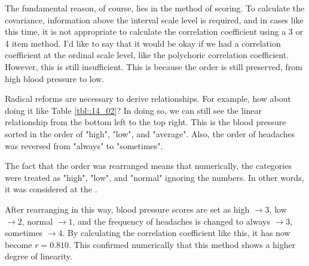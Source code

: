 \documentclass{ltjsbook}
\begin{document}
The fundamental reason, of course, lies in the method of scoring. To calculate the covariance, information above the interval scale level is required, and in cases like this time, it is not appropriate to calculate the correlation coefficient using a 3 or 4 item method.
I'd like to say that it would be okay if we had a correlation coefficient at the ordinal scale level, like the polychoric correlation coefficient. However, this is still insufficient. This is because the order is still preserved, from high blood pressure to low.

Radical reforms are necessary to derive relationships. For example, how about doing it like Table \ref{tbl::14_02}? In doing so, we can still see the linear relationship from the bottom left to the top right.
This is the blood pressure sorted in the order of "high", "low", and "average".
Also, the order of headaches was reversed from "always" to "sometimes".

The fact that the order was rearranged means that numerically, the categories were treated as "high", "low", and "normal" ignoring the numbers. In other words, it was considered at the .

After rearranging in this way, blood pressure scores are set as high $\to3$, low $\to2$, normal $\to1$, and the frequency of headaches is changed to always $\to3$, sometimes $\to4$. By calculating the correlation coefficient like this, it has now become $r=0.810$. This confirmed numerically that this method shows a higher degree of linearity.
\end{document}
